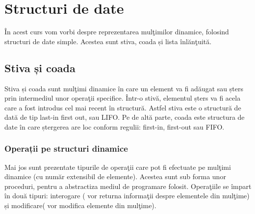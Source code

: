 \chapter{Structuri de date}
\label{abody}%

În acest curs vom vorbi despre reprezentarea mulţimilor dinamice, folosind structuri de date simple. Acestea sunt stiva, coada și lista înlănţuită.

\section{Stiva și coada}

Stiva și coada sunt mulţimi dinamice în care un element va fi adăugat sau șters prin intermediul unor operaţii specifice. Într-o stivă, elementul șters va fi acela care a fost introdus cel mai recent în structură. Astfel stiva este o structură de dată de tip last-in first out, sau LIFO. Pe de altă parte, coada este structura de date în care ștergerea are loc conform regulii: first-in, first-out sau FIFO.

\subsection{Operații pe structuri dinamice}

Mai jos sunt prezentate tipurile de operaţii care pot fi efectuate pe mulţimi dinamice (cu număr extensibil de elemente). Acestea sunt sub forma unor proceduri, pentru a abstractiza mediul de programare folosit. Operaţiile se împart în două tipuri: interogare ( vor returna informaţii despre elementele din mulţime) și modificare( vor modifica elemente din mulţime).

